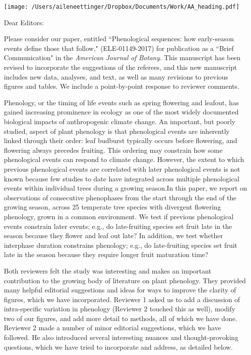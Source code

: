 \documentclass[10.95pt,a4paper]{letter}
\date{May 31, 2018}
\begin{document}
%

\begin{letter}{}
\texttt{[image: /Users/aileneettinger/Dropbox/Documents/Work/AA\_heading.pdf]}

\opening{Dear Editors:}
Please consider our paper, entitled ``Phenological sequences: how early-season events define those that follow,"  (ELE-01149-2017) for publication as a ``Brief Communication" in the \emph{American Journal of Botany.} This manuscript has been revised to incorporate the suggestions of the referees, and this new manuscript includes new data, analyses, and text, as well as many revisions to previous figures and tables. We include a point-by-point response to reviewer comments.

Phenology, or the timing of life events such as spring flowering and leafout, has gained increasing prominence in ecology as one of the most widely documented biological impacts of anthropogenic climate change.  An important, but poorly studied, aspect of plant phenology is that phenological events are inherently linked through their order: leaf budburst typically occurs before flowering, and flowering always precedes fruiting. This ordering may constrain how some phenological events can respond to climate change. However, the extent to which previous phenological events are correlated with later phenological events is not known because few studies to date have integrated across multiple phenological events within individual trees during a growing season.In this paper, we report on observations of consecutive phenophases from the start through the end of the growing season, across 25 temperate tree species with divergent flowering phenology, grown in a common environment. We test if previous phenological events constrain later events; e.g., do late-fruiting species set fruit late in the season because they flower and leaf out late? In addition, we test whether interphase duration constrains phenology; e.g., do late-fruiting species set fruit late in the season because they require longer fruit maturation time? 

Both reviewers felt the study was interesting and makes an important contribution to the growing body of literature on plant phenology.  They provided many helpful editorial suggestions and ideas for ways to improve the clarity of figures, which we have incorporated. Reviewer 1 asked us to add a discussion of intra-specific variation in phenology (Reviewer 2 touched this as well), modify two of our figures, and add more detail to methods, all of which we have done. Reviewer 2 made a number of minor editorial suggestions, which we have followed. He also introduced several interesting nuances and thought-provoking questions, which we have tried to incorporate and address, as detailed below. 


\end{letter}
\end{document}

